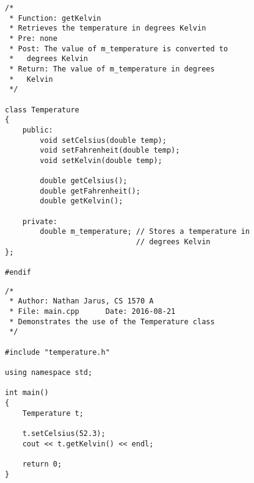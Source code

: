 \documentclass{article}
\begin{document}
\begin{lstlisting}[caption=temperature.h]
/*
 * Function: getKelvin
 * Retrieves the temperature in degrees Kelvin
 * Pre: none
 * Post: The value of m_temperature is converted to
 *   degrees Kelvin
 * Return: The value of m_temperature in degrees
 *   Kelvin
 */

class Temperature
{
	public:
		void setCelsius(double temp);
		void setFahrenheit(double temp);
		void setKelvin(double temp);

		double getCelsius();
		double getFahrenheit();
		double getKelvin();

	private:
		double m_temperature; // Stores a temperature in
		                      // degrees Kelvin
};

#endif
\end{lstlisting}

\begin{lstlisting}[caption=main.cpp]
/*
 * Author: Nathan Jarus, CS 1570 A
 * File: main.cpp      Date: 2016-08-21
 * Demonstrates the use of the Temperature class
 */

#include "temperature.h"

using namespace std;

int main()
{
	Temperature t;

	t.setCelsius(52.3);
	cout << t.getKelvin() << endl;

	return 0;
}
\end{lstlisting}
\end{document}
